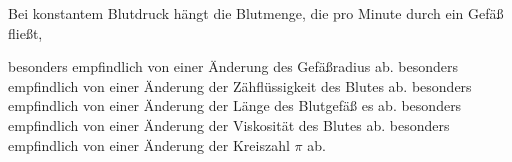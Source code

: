 \documentclass[11pt]{exam}
\begin{document}
\begin{questions}
\vspace{3mm}\question Bei konstantem Blutdruck hängt die Blutmenge, die pro Minute durch ein Gefäß fließt,

\begin{choices}
	\choice besonders empfindlich von einer Änderung des Gefäßradius ab.
	\choice besonders empfindlich von einer Änderung der Zähflüssigkeit des Blutes ab.
	\choice besonders empfindlich von einer Änderung der Länge des Blutgefäß es ab.
	\choice besonders empfindlich von einer Änderung der Viskosität des Blutes ab.
	\choice besonders empfindlich von einer Änderung der Kreiszahl \(\pi\) ab.
\end{choices}

\vspace{3mm}\end{questions}
\end{document}
